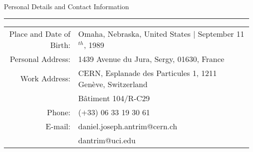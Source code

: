 \newcommand{\HRule}{\rule{\linewidth}{0.5mm}}

\newenvironment{myindentpar}[1]%
{\begin{list}{}%
          {\setlength{\leftmargin}{#1}}%
          \item[]%
}
{\end{list}}

\vspace{0.25in}

{\Large Personal Details and Contact Information}\\
\HRule
\vspace{0.25in}

\begin{minipage}{0.45\linewidth}
	\hspace{0.18in}
  \begin{tabular}{rl}
    Place and Date of Birth: & \hspace{0.5em} Omaha, Nebraska, United States $\mid$ September 11$^{th}$, 1989 \\
    Personal Address: & \hspace{0.5em} 1439 Avenue du Jura, Sergy, 01630, France \\
    Work Address: & \hspace{0.5em} CERN, Esplanade des Particules 1, 1211 Gen\`{e}ve, Switzerland \\ 
                & \hspace{0.5em} B\^{a}timent 104/R-C29 \\
    Phone:             & \hspace{0.5em} ($+$33) 06 33 19 30 61 \\
    E-mail:            & \hspace{0.5em} daniel.joseph.antrim@cern.ch \\
                       & \hspace{0.5em} dantrim@uci.edu
  \end{tabular}
\end{minipage}

